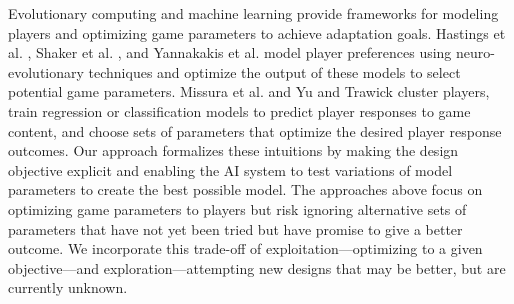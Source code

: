 \documentclass{sig-alternate}
\begin{document}
Evolutionary computing and machine learning provide frameworks for modeling players and optimizing game parameters to achieve adaptation goals.
Hastings et al. \cite{hastings2009:gar}, Shaker et al. \cite{pedersen2009:smb, shaker2010:platformer-gen}, and Yannakakis et al. \cite{yannakakis2009:playermodel} model player preferences using neuro-evolutionary techniques and optimize the output of these models to select potential game parameters.
Missura et al. \cite{missura2009:dda} and Yu and Trawick \cite{yu2011:minboredom} cluster players, train regression or classification models to predict player responses to game content, and choose sets of parameters that optimize the desired player response outcomes.
Our approach formalizes these intuitions by making the design objective explicit and enabling the AI system to test variations of model parameters to create the best possible model.
The approaches above focus on optimizing game parameters to players but risk ignoring alternative sets of parameters that have not yet been tried but have promise to give a better outcome.
We incorporate this trade-off of exploitation---optimizing to a given objective---and exploration---attempting new designs that may be better, but are currently unknown.
\end{document}
